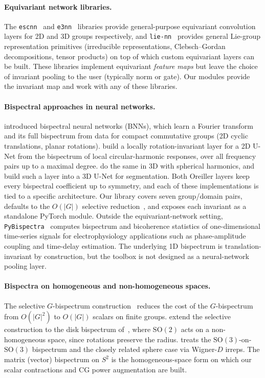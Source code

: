 \documentclass{article}
\theoremstyle{definition}
\theoremstyle{remark}
\newcommand{\SO}{\mathrm{SO}}
\theoremstyle{definition}
\begin{document}
\paragraph{Equivariant network libraries.}
The \texttt{escnn}~\citep{cesa2022program} and \texttt{e3nn}~\citep{geiger2022e3nn}
libraries provide general-purpose equivariant convolution layers for 2D and 3D
groups respectively, and \texttt{lie-nn}~\citep{batatia2023general}
provides general Lie-group representation primitives (irreducible
representations, Clebsch--Gordan decompositions, tensor products) on
top of which custom equivariant layers can be built. These libraries
implement equivariant \emph{feature maps} but leave the choice of
invariant pooling to the user (typically norm or gate). Our modules provide the invariant map and work with any of these libraries.

\paragraph{Bispectral approaches in neural networks.}
\citet{sanborn2023bispectral} introduced bispectral neural networks (BNNs),
which learn a Fourier transform and its full bispectrum from data for compact
commutative groups (2D cyclic translations, planar rotations).
\citet{oreiller2022bispectral} build a locally rotation-invariant layer for a
2D U-Net from the bispectrum of local circular-harmonic responses, over all
frequency pairs up to a maximal degree. \citet{oreiller2020solid} do the same
in 3D with spherical harmonics, and \citet{chevalley2024bispectral} build such
a layer into a 3D U-Net for segmentation. Both Oreiller layers keep every
bispectral coefficient up to symmetry, and each of these implementations is
tied to a specific architecture. Our library
covers seven group/domain pairs, defaults to the
$O(|G|)$ selective reduction~\citep{mataigne2024selective}, and exposes
each invariant as a standalone PyTorch module.
Outside the equivariant-network setting,
\texttt{PyBispectra}~\citep{binns2025pybispectra} computes bispectrum
and bicoherence statistics of one-dimensional time-series signals for
electrophysiology applications such as phase-amplitude coupling and
time-delay estimation. The underlying 1D bispectrum is translation-invariant
by construction, but the toolbox is not designed as a neural-network
pooling layer.

\paragraph{Bispectra on homogeneous and non-homogeneous spaces.}
The selective $G$-bispectrum
construction~\citep{mataigne2024selective} reduces the cost of the
$G$-bispectrum from $O(|G|^2)$ to $O(|G|)$ scalars on finite groups.
\citet{myers2025selective} extend the selective construction to the
disk bispectrum of~\citet{zhao2014rotationally}, where $\SO(2)$ acts on a non-homogeneous space,
since rotations preserve the radius.
\citet{kakarala2012bispectrum} treats the $\SO(3)$-on-$\SO(3)$
bispectrum and the closely related sphere case via Wigner-$D$ irreps.
The matrix (vector) bispectrum on $S^2$ is the homogeneous-space form
on which our scalar contractions and CG power augmentation are built.
\end{document}
